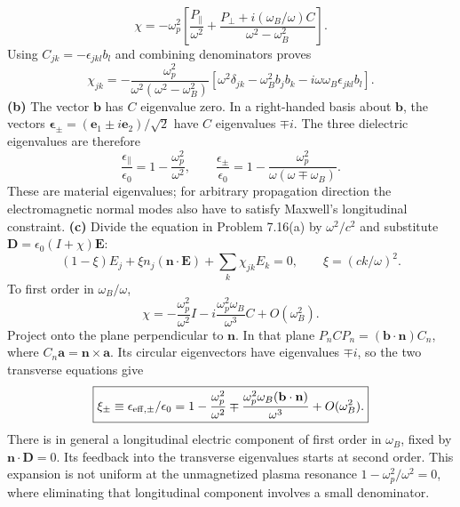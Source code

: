 \[
\chi=-\omega_p^2\left[
\frac{P_\parallel}{\omega^2}
+\frac{P_\perp+i(\omega_B/\omega)C}{\omega^2-\omega_B^2}\right].
\]
Using $C_{jk}=-\epsilon_{jkl}b_l$ and combining denominators proves
\[
\boxed{\chi_{jk}=-\frac{\omega_p^2}
{\omega^2(\omega^2-\omega_B^2)}
[\omega^2\delta_{jk}-\omega_B^2b_jb_k
-i\omega\omega_B\epsilon_{jkl}b_l].}
\]
\textbf{(b)} The vector $\mathbf b$ has $C$ eigenvalue zero.
In a right-handed basis about $\mathbf b$, the vectors
$\boldsymbol\epsilon_\pm=(\mathbf e_1\pm i\mathbf e_2)/\sqrt2$
have $C$ eigenvalues $\mp i$. The three dielectric eigenvalues are
therefore
\[
\boxed{\frac{\epsilon_\parallel}{\epsilon_0}=1-\frac{\omega_p^2}{\omega^2},
\qquad
\frac{\epsilon_\pm}{\epsilon_0}
=1-\frac{\omega_p^2}{\omega(\omega\mp\omega_B)}.}
\]
These are material eigenvalues; for arbitrary propagation direction
the electromagnetic normal modes also have to satisfy Maxwell's
longitudinal constraint.
\textbf{(c)} Divide the equation in Problem 7.16(a) by
$\omega^2/c^2$ and substitute $\mathbf D=\epsilon_0(I+\chi)\mathbf E$:
\[
\boxed{(1-\xi)E_j+\xi n_j(\mathbf n\cdot\mathbf E)
+\sum_k\chi_{jk}E_k=0,\qquad \xi=(ck/\omega)^2.}
\]
To first order in $\omega_B/\omega$,
\[
\chi=-\frac{\omega_p^2}{\omega^2}I
-i\frac{\omega_p^2\omega_B}{\omega^3}C+O(\omega_B^2).
\]
Project onto the plane perpendicular to $\mathbf n$. In that plane
$P_n C P_n=(\mathbf b\cdot\mathbf n)C_n$, where
$C_n\mathbf a=\mathbf n\times\mathbf a$.
Its circular eigenvectors have eigenvalues $\mp i$, so the two
transverse equations give
\[
\boxed{\xi_\pm\equiv\epsilon_{\rm eff,\pm}/\epsilon_0
=1-\frac{\omega_p^2}{\omega^2}
\mp\frac{\omega_p^2\omega_B(\mathbf b\cdot\mathbf n)}{\omega^3}
+O(\omega_B^2).}
\]
There is in general a longitudinal electric component of first
order in $\omega_B$, fixed by $\mathbf n\cdot\mathbf D=0$.
Its feedback into the transverse eigenvalues starts at second order.
This expansion is not uniform at the unmagnetized plasma resonance
$1-\omega_p^2/\omega^2=0$, where eliminating that longitudinal
component involves a small denominator.


